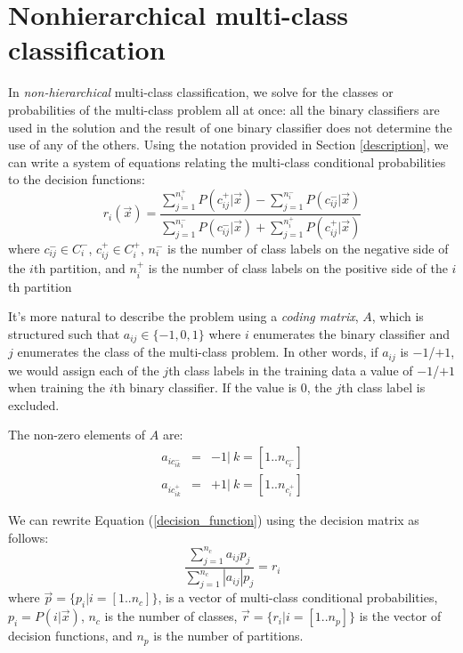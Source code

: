 \documentclass{article}
\begin{document}
\section{Nonhierarchical multi-class classification}

In {\it non-hierarchical} multi-class classification, we solve for the
classes or probabilities of the multi-class problem all at once:
all the binary classifiers are used in the solution and the result of
one binary classifier does not determine the use of any of the others.
Using the notation provided in Section \ref{description}, 
we can write a system of equations relating
the multi-class conditional probabilities to the decision
functions:
\begin{equation}
	r_i(\vec x) = \frac{\sum_{j=1}^{n_i^+} P(c_{ij}^+|\vec x) - \sum_{j=1}^{n_{i}^-} P(c_{ij}^-|\vec x)}{\sum_{j=1}^{n_i^-} P(c_{ij}^-|\vec x) + \sum_{j=1}^{n_i^+} P(c_{ij}^+|\vec x)}
	\label{decision_function}
\end{equation}
where 
$c_{ij}^- \in C_i^-$,
$c_{ij}^+ \in C_i^+$,
$n_i^-$ is the number of class labels on the negative side of
the $i$th partition,
and $n_i^+$ is the number of class labels on the positive side of
the $i$th partition

It's more natural to describe the problem using a
{\it coding matrix}, $A$, 
which is structured such that
$a_{ij} \in \lbrace -1, 0, 1 \rbrace$ where $i$ enumerates the binary classifier and
$j$ enumerates the class of the multi-class problem.
In other words, if $a_{ij}$ is $-1$/$+1$, we would assign each of the $j$th class
labels in the training data a value of $-1$/$+1$ when training the $i$th
binary classifier. If the value is $0$, the $j$th class label is excluded.

The non-zero elements of $A$ are:
\begin{eqnarray}
	a_{ic_{ik}^-} & = & -1 | ~k = [1..n_{c_i^-}]\\
a_{ic_{ik}^+} & = & +1 | ~k=[1..n_{c_i^+}]
\end{eqnarray}

We can rewrite Equation (\ref{decision_function}) using the decision
matrix as follows:
\begin{equation}
	\frac{\sum_{j=1}^{n_c} a_{ij} p_j}{\sum_{j=1}^{n_c} |a_{ij}| p_j} = r_i
	\label{non_hier}
\end{equation}
where $\vec p=\lbrace p_i | i=[1..n_c]\rbrace$, 
is a vector of multi-class conditional probabilities, $p_i=P(i|\vec x)$, 
$n_c$ is the number of classes,
$\vec r=\lbrace r_i| i=[1..n_p]\rbrace$ 
is the vector of decision functions,
and
$n_p$ is the number of partitions.
\end{document}
